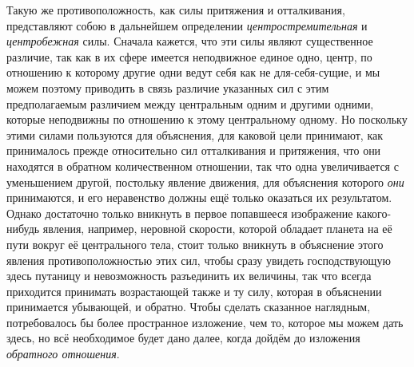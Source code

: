 Такую же противоположность, как силы притяжения и отталкивания, представляют
собою в дальнейшем определении {\em центростремительная} и
{\em центробежная} силы. Сначала кажется, что эти силы
являют существенное различие, так как в их сфере имеется неподвижное единое
одно, центр, по отношению к которому другие одни ведут себя как не
для-себя-сущие, и мы можем поэтому приводить в связь различие указанных сил
с этим предполагаемым различием между центральным одним и другими одними,
которые неподвижны по отношению к этому центральному одному. Но поскольку
этими силами пользуются для объяснения, для каковой цели принимают, как
принималось прежде относительно сил отталкивания и притяжения, что они
находятся в обратном количественном отношении, так что одна увеличивается с
уменьшением другой, постольку явление движения, для объяснения которого
{\em они} принимаются, и его неравенство должны ещё
только оказаться их результатом. Однако достаточно только вникнуть в первое
попавшееся изображение какого-нибудь явления, например, неровной скорости,
которой обладает планета на её пути вокруг её центрального тела, стоит
только вникнуть в объяснение этого явления противоположностью этих сил,
чтобы сразу увидеть господствующую здесь путаницу и невозможность
разъединить их величины, так что всегда приходится принимать возрастающей
также и ту силу, которая в объяснении принимается убывающей, и обратно.
Чтобы сделать сказанное наглядным, потребовалось бы более пространное
изложение, чем то, которое мы можем дать здесь, но всё необходимое будет
дано далее, когда дойдём до изложения {\em обратного отношения}.

\bigskip
